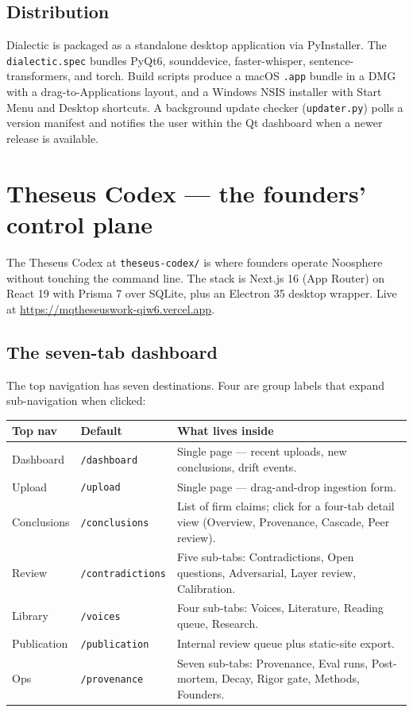 \documentclass[11pt,letterpaper]{article}
\newcommand{\file}[1]{\texttt{#1}}
\begin{document}
\subsection{Distribution}

Dialectic is packaged as a standalone desktop application via PyInstaller. The \file{dialectic.spec} bundles PyQt6, sounddevice, faster-whisper, sentence-transformers, and torch. Build scripts produce a macOS \file{.app} bundle in a DMG with a drag-to-Applications layout, and a Windows NSIS installer with Start Menu and Desktop shortcuts. A background update checker (\file{updater.py}) polls a version manifest and notifies the user within the Qt dashboard when a newer release is available.

\section{Theseus Codex --- the founders' control plane}

The Theseus Codex at \file{theseus-codex/} is where founders operate Noosphere without touching the command line. The stack is Next.js 16 (App Router) on React 19 with Prisma 7 over SQLite, plus an Electron 35 desktop wrapper. Live at \url{https://mqtheseuswork-qiw6.vercel.app}.

\subsection{The seven-tab dashboard}

The top navigation has seven destinations. Four are group labels that expand sub-navigation when clicked:

\begin{longtable}{@{}p{2.6cm} p{1.7cm} p{10.0cm}@{}}
\toprule
\textbf{Top nav} & \textbf{Default} & \textbf{What lives inside} \\
\midrule
\endhead
Dashboard   & \file{/dashboard}      & Single page --- recent uploads, new conclusions, drift events. \\
Upload      & \file{/upload}         & Single page --- drag-and-drop ingestion form. \\
Conclusions & \file{/conclusions}    & List of firm claims; click for a four-tab detail view (Overview, Provenance, Cascade, Peer review). \\
Review      & \file{/contradictions} & Five sub-tabs: Contradictions, Open questions, Adversarial, Layer review, Calibration. \\
Library     & \file{/voices}         & Four sub-tabs: Voices, Literature, Reading queue, Research. \\
Publication & \file{/publication}    & Internal review queue plus static-site export. \\
Ops         & \file{/provenance}     & Seven sub-tabs: Provenance, Eval runs, Post-mortem, Decay, Rigor gate, Methods, Founders. \\
\bottomrule
\end{longtable}
\end{document}
